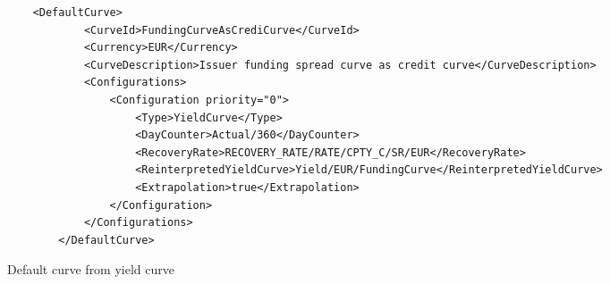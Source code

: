 \begin{longlisting}
\begin{verbatim}
    <DefaultCurve>
			<CurveId>FundingCurveAsCrediCurve</CurveId>
			<Currency>EUR</Currency>
			<CurveDescription>Issuer funding spread curve as credit curve</CurveDescription>
			<Configurations>
				<Configuration priority="0">
					<Type>YieldCurve</Type>
					<DayCounter>Actual/360</DayCounter>
					<RecoveryRate>RECOVERY_RATE/RATE/CPTY_C/SR/EUR</RecoveryRate>
					<ReinterpretedYieldCurve>Yield/EUR/FundingCurve</ReinterpretedYieldCurve>
					<Extrapolation>true</Extrapolation>
				</Configuration>
			</Configurations>
		</DefaultCurve>
\end{verbatim}
\caption{Default curve from yield curve}
\label{lst:defaultcurve_from_yield}
\end{longlisting}